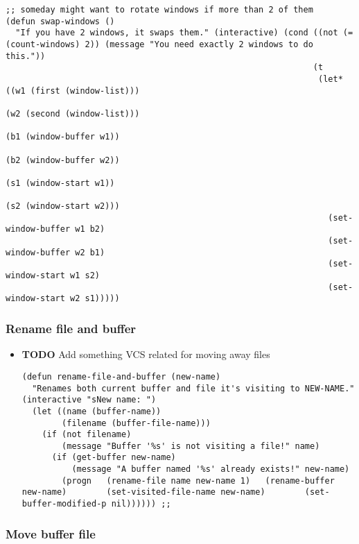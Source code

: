 \documentclass[11pt]{article}
\begin{document}
\begin{verbatim}
;; someday might want to rotate windows if more than 2 of them
(defun swap-windows ()
  "If you have 2 windows, it swaps them." (interactive) (cond ((not (= (count-windows) 2)) (message "You need exactly 2 windows to do this."))
                                                              (t
                                                               (let* ((w1 (first (window-list)))
                                                                      (w2 (second (window-list)))
                                                                      (b1 (window-buffer w1))
                                                                      (b2 (window-buffer w2))
                                                                      (s1 (window-start w1))
                                                                      (s2 (window-start w2)))
                                                                 (set-window-buffer w1 b2)
                                                                 (set-window-buffer w2 b1)
                                                                 (set-window-start w1 s2)
                                                                 (set-window-start w2 s1)))))
\end{verbatim}
\subsubsection{Rename file and buffer}
\label{sec-18.2.8}
\begin{itemize}

\item \textbf{TODO} Add something VCS related for moving away files
\label{sec-18.2.8.1}%
\begin{verbatim}
(defun rename-file-and-buffer (new-name)
  "Renames both current buffer and file it's visiting to NEW-NAME." (interactive "sNew name: ")
  (let ((name (buffer-name))
        (filename (buffer-file-name)))
    (if (not filename)
        (message "Buffer '%s' is not visiting a file!" name)
      (if (get-buffer new-name)
          (message "A buffer named '%s' already exists!" new-name)
        (progn   (rename-file name new-name 1)   (rename-buffer new-name)        (set-visited-file-name new-name)        (set-buffer-modified-p nil)))))) ;;
\end{verbatim}


\end{itemize} %
\subsubsection{Move buffer file}
\label{sec-18.2.9}
\end{document}
